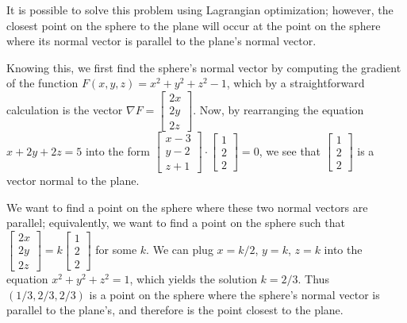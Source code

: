 \item

It is possible to solve this problem using Lagrangian optimization;
however, the closest point on the sphere to the plane will occur at
the point on the sphere where its normal vector is parallel to the plane's
normal vector.


Knowing this, we first find the sphere's normal vector by computing
the gradient of the function $F(x,y,z) = x^2 + y^2 + z^2 - 1$, which by
a straightforward calculation is the vector
$\nabla F = \begin{bmatrix} 2x \\ 2y \\ 2z \end{bmatrix}$.  Now, by
rearranging the equation $x + 2y + 2z = 5$ into the form
$\begin{bmatrix} x - 3 \\ y -2 \\ z + 1 \end{bmatrix} \cdot
 \begin{bmatrix} 1 \\ 2 \\ 2 \end{bmatrix} = 0$, we see that
$\begin{bmatrix} 1 \\ 2 \\ 2 \end{bmatrix}$ is a vector normal to the plane.

We want to find a point on the sphere where these two normal vectors are
parallel; equivalently, we want to find a point on the sphere such that
$\begin{bmatrix} 2x \\ 2y \\ 2z \end{bmatrix}
 = k\begin{bmatrix} 1 \\ 2 \\ 2 \end{bmatrix}$ for some $k$.  We can plug
$x = k/2$, $y = k$, $z = k$ into the equation $x^2 + y^2 + z^2 = 1$, which
yields the solution $k = 2/3$.  Thus $(1/3, 2/3, 2/3)$ is a point on the
sphere where the sphere's normal vector is parallel to the plane's, and
therefore is the point closest to the plane.

